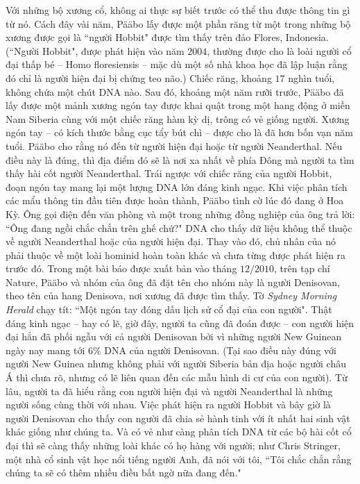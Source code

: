 \begin{multicols}{2}
	\vskip 0.1cm
	Với những bộ xương cổ, không ai thực sự biết trước có thể thu được thông tin gì từ nó. Cách đây vài năm, Pääbo lấy được một phần răng từ một trong những bộ xương được gọi là ``người Hobbit" được tìm thấy trên đảo Flores, Indonesia. (``Người Hobbit", được phát hiện vào năm $2004$, thường được cho là loài người cổ đại thấp bé -- Homo floresiensis -- mặc dù một số nhà khoa học đã lập luận rằng đó chỉ là người hiện đại bị chứng teo não.) Chiếc răng, khoảng $17$ nghìn tuổi, không chứa một chút DNA nào.
	\vskip 0.1cm
	Sau đó, khoảng một năm rưỡi trước, Pääbo đã lấy được một mảnh xương ngón tay được khai quật trong một hang động ở miền Nam Siberia cùng với một chiếc răng hàm kỳ dị, trông có vẻ giống người. Xương ngón tay -- có kích thước bằng cục tẩy bút chì -- được cho là đã hơn bốn vạn năm tuổi. Pääbo cho rằng nó đến từ người hiện đại hoặc từ người Neanderthal. Nếu điều này là đúng, thì địa điểm đó sẽ là nơi xa nhất về phía Đông mà người ta tìm thấy hài cốt người Neanderthal.
	\vskip 0.1cm
	Trái ngược với chiếc răng của người Hobbit, đoạn ngón tay mang lại một lượng DNA lớn đáng kinh ngạc. Khi việc phân tích các mẩu thông tin đầu tiên được hoàn thành, Pääbo tình cờ lúc đó đang ở Hoa Kỳ. Ông gọi điện đến văn phòng và một trong những đồng nghiệp của ông trả lời: ``Ông đang ngồi chắc chắn trên ghế chứ?" DNA cho thấy dữ liệu không thể thuộc về người Neanderthal hoặc của người hiện đại. Thay vào đó, chủ nhân của nó phải thuộc về một loài hominid hoàn toàn khác và chưa từng được phát hiện ra trước đó. Trong một bài báo được xuất bản vào tháng $12/2010$, trên tạp chí Nature, Pääbo và nhóm của ông đã đặt tên cho nhóm này là người Denisovan, theo tên của hang Denisova, nơi xương đã được tìm thấy. Tờ \textit{Sydney Morning Herald} chạy tít: ``Một ngón tay đóng dấu lịch sử cổ đại của con người". Thật đáng kinh ngạc -- hay có lẽ, giờ đây, người ta cũng đã đoán được -- con người hiện đại hẳn đã phối ngẫu với cả người Denisovan bởi vì những người New Guinean ngày nay mang tới $6\%$ DNA của người Denisovan. (Tại sao điều này đúng với người New Guinea nhưng không phải với người Siberia bản địa hoặc người châu Á thì chưa rõ, nhưng có lẽ liên quan đến các mẫu hình di cư của con người).
	\vskip 0.1cm
	Từ lâu, người ta đã hiểu rằng con người hiện đại và người Neanderthal là những người sống cùng thời với nhau. Việc phát hiện ra người Hobbit và bây giờ là người Denisovan cho thấy con người đã chia sẻ hành tinh với ít nhất hai sinh vật khác giống như chúng ta. Và có vẻ như càng phân tích DNA từ các bộ hài cốt cổ đại thì sẽ càng thấy những loài khác có họ hàng với người; như Chris Stringer, một nhà cổ sinh vật học nổi tiếng người Anh, đã nói với tôi, ``Tôi chắc chắn rằng chúng ta sẽ có thêm nhiều điều bất ngờ nữa đang đến."

\end{multicols}
